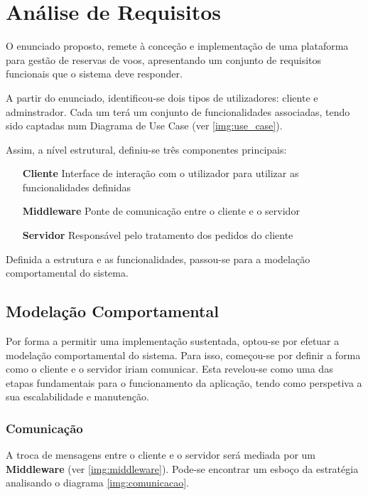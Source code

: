 \documentclass[a4paper,11pt]{article}
\begin{document}

\section{Análise de Requisitos} \label{chap:analise_requisitos}

O enunciado proposto, remete à conceção e implementação de uma plataforma para gestão de reservas 
de voos, apresentando um conjunto de requisitos funcionais que o sistema deve responder.

A partir do enunciado, identificou-se dois tipos de utilizadores: cliente e adminstrador.
Cada um terá um conjunto de funcionalidades associadas,
tendo sido captadas num Diagrama de Use Case (ver \ref{img:use_case}).

Assim, a nível estrutural, definiu-se três componentes principais:
\begin{itemize}
    \item[\textbf{Cliente}] Interface de interação com o utilizador para utilizar as funcionalidades definidas
    \item[\textbf{Middleware}] Ponte de comunicação entre o cliente e o servidor
    \item[\textbf{Servidor}] Responsável pelo tratamento dos pedidos do cliente
\end{itemize}

Definida a estrutura e as funcionalidades, passou-se para a modelação comportamental do sistema.

\subsection{Modelação Comportamental} \label{strat_esc}

Por forma a permitir uma implementação sustentada, optou-se por efetuar a modelação comportamental 
do sistema.
Para isso, começou-se por definir a forma como o cliente e o servidor iriam comunicar.
Esta revelou-se como uma das etapas fundamentais para o funcionamento da aplicação,
tendo como perspetiva a sua escalabilidade e manutenção.

\subsubsection{Comunicação}

A troca de mensagens entre o cliente e o servidor será mediada por um \textbf{Middleware} (ver \ref{img:middleware}).
Pode-se encontrar um esboço da estratégia analisando o diagrama \ref{img:comunicacao}.
\end{document}

